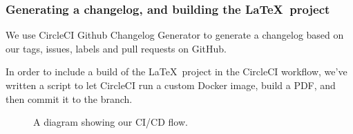 \subsubsection{Generating a changelog, and building the \LaTeX\ project}

We use CircleCI Github Changelog Generator \cite{tool:changelog-generator} to generate a changelog based on our tags, issues, labels and pull requests on GitHub.

In order to include a build of the \LaTeX\ project in the CircleCI workflow, we've written a script to let CircleCI run a custom Docker image, build a PDF, and then commit it to the branch.

\begin{figure}[H]
    \caption{A diagram showing our CI/CD flow.}
    \label{fig:ci-cd-diagram}
\end{figure}
